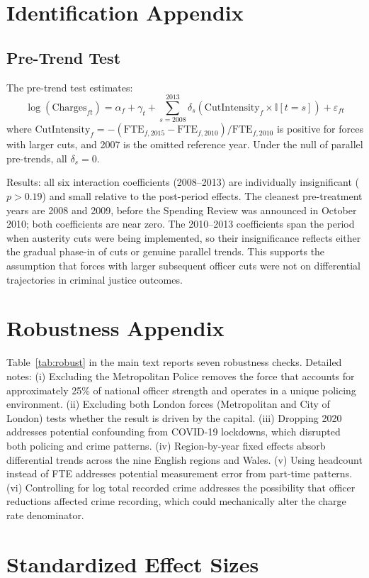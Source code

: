 \documentclass[12pt]{article}
\newcommand{\ind}{\mathbb{I}}
\begin{document}
\section{Identification Appendix}

\subsection{Pre-Trend Test}

The pre-trend test estimates:
\begin{equation}
\log(\text{Charges}_{ft}) = \alpha_f + \gamma_t + \sum_{s=2008}^{2013} \delta_s (\text{CutIntensity}_f \times \ind[t = s]) + \varepsilon_{ft}
\end{equation}
where $\text{CutIntensity}_f = -(\text{FTE}_{f,2015} - \text{FTE}_{f,2010}) / \text{FTE}_{f,2010}$ is positive for forces with larger cuts, and 2007 is the omitted reference year. Under the null of parallel pre-trends, all $\delta_s = 0$.

Results: all six interaction coefficients (2008--2013) are individually insignificant ($p > 0.19$) and small relative to the post-period effects. The cleanest pre-treatment years are 2008 and 2009, before the Spending Review was announced in October 2010; both coefficients are near zero. The 2010--2013 coefficients span the period when austerity cuts were being implemented, so their insignificance reflects either the gradual phase-in of cuts or genuine parallel trends. This supports the assumption that forces with larger subsequent officer cuts were not on differential trajectories in criminal justice outcomes.

\section{Robustness Appendix}

Table~\ref{tab:robust} in the main text reports seven robustness checks. Detailed notes: (i) Excluding the Metropolitan Police removes the force that accounts for approximately 25\% of national officer strength and operates in a unique policing environment. (ii) Excluding both London forces (Metropolitan and City of London) tests whether the result is driven by the capital. (iii) Dropping 2020 addresses potential confounding from COVID-19 lockdowns, which disrupted both policing and crime patterns. (iv) Region-by-year fixed effects absorb differential trends across the nine English regions and Wales. (v) Using headcount instead of FTE addresses potential measurement error from part-time patterns. (vi) Controlling for log total recorded crime addresses the possibility that officer reductions affected crime recording, which could mechanically alter the charge rate denominator.

\section{Standardized Effect Sizes}
\label{sec:sde}


\end{document}
